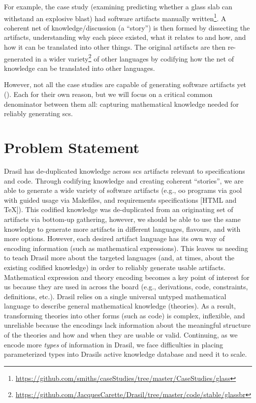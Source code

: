 For example, the  case study (examining predicting whether a glass
slab can withstand an explosive blast) had software artifacts manually
written\footnote{\url{https://github.com/smiths/caseStudies/tree/master/CaseStudies/glass}}.
A coherent net of knowledge/discussion (a ``story'') is then formed by
dissecting the artifacts, understanding why each piece existed, what it relates
to and how, and how it can be translated into other things. The original
artifacts are then re-generated in a wider
variety\footnote{\url{https://github.com/JacquesCarette/Drasil/tree/master/code/stable/glassbr}}
of other languages by codifying how the net of knowledge can be translated into
other languages.

However, not all the case studies are capable of generating software artifacts
yet (). Each for their own reason, but we will focus
on a critical common denominator between them all: capturing mathematical
knowledge needed for reliably generating \acs{scs}.

\section{Problem Statement}
\label{sec:intro:problemStatement}

Drasil has de-duplicated knowledge across \acs{scs} artifacts relevant to
specifications and code. Through codifying knowledge and creating coherent
``stories'', we are able to generate a wide variety of software artifacts (e.g.,
\acs{oo} programs via \acs{gool} with guided usage via Makefiles, and
requirements specifications [HTML and TeX]). This codified knowledge was
de-duplicated from an originating set of artifacts via bottom-up gathering,
however, we should be able to use the same knowledge to generate more artifacts
in different languages, flavours, and with more options. However, each desired
artifact language has its own way of encoding information (such as mathematical
expressions). This leaves us needing to teach Drasil more about the targeted
languages (and, at times, about the existing codified knowledge) in order to
reliably generate usable artifacts. Mathematical expression and theory encoding
becomes a key point of interest for us because they are used in across the board
(e.g., derivations, code, constraints, definitions, etc.). Drasil relies on a
single universal untyped mathematical language to describe general mathematical
knowledge (theories). As a result, transforming theories into other forms (such
as code) is complex, inflexible, and unreliable because the encodings lack
information about the meaningful structure of the theories and how and when they
are usable or valid. Continuing, as we encode more \textit{types} of information
in Drasil, we face difficulties in placing parameterized types into Drasils
active knowledge database and need it to scale.

